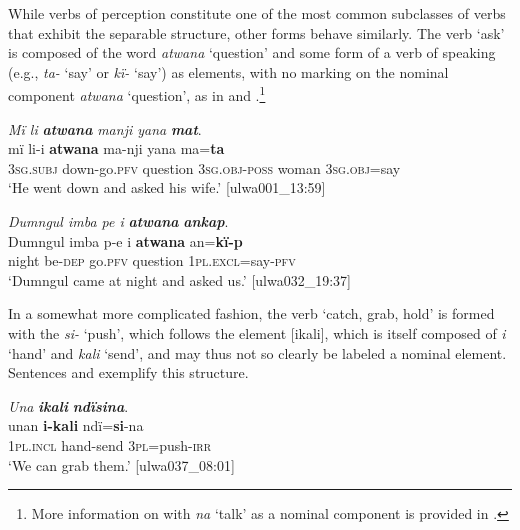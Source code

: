 While  verbs of perception constitute one of the most common subclasses of verbs that exhibit the separable structure, other  forms behave similarly. The verb ‘ask’ is composed of the word \textit{atwana} ‘question’ and some form of a verb of speaking (e.g., \textit{ta-} ‘say’ or \textit{kï-} ‘say’) as  elements, with no  marking on the nominal component \textit{atwana} ‘question’, as in  and .\footnote{More information on  with \textit{na} ‘talk’ as a nominal component is provided in .}

\ea%
    \label{ex:phrase:69}
          \textit{Mï li} \textbf{\textit{atwana}} \textit{manji yana} \textbf{\textit{mat}}.\\
\gll mï      li-i        \textbf{atwana}  ma-nji      yana     ma=\textbf{ta}\\
    3\textsc{sg.subj}  down-go.\textsc{pfv}  question  3\textsc{sg.obj-poss}  woman    3\textsc{sg.obj}=say\\
\glt `He went down and asked his wife.’ [ulwa001\_13:59]
\z

\ea%
    \label{ex:phrase:70}
          \textit{Dumngul imba pe i} \textbf{\textit{atwana}} \textbf{\textit{ankap}}.\\
\gll Dumngul  imba  p-e    i    \textbf{atwana}  an=\textbf{kï-p}\\
    [name]    night  be\textsc{{}-dep} go.\textsc{pfv}  question  1\textsc{pl.excl}=say-\textsc{pfv}\\
\glt `Dumngul came at night and asked us.’ [ulwa032\_19:37]
\z

  In a somewhat more complicated fashion, the verb ‘catch, grab, hold’ is formed with the  \textit{si-} ‘push’, which follows the  element [ikali], which is itself composed of \textit{i} ‘hand’ and \textit{kali} ‘send’, and may thus not so clearly be labeled a nominal element. Sentences  and  exemplify this structure.

\ea%
    \label{ex:phrase:71}
          \textit{Una} \textbf{\textit{ikali}} \textbf{\textit{ndïsina}}.\\
\gll unan    \textbf{i-kali}    ndï=\textbf{si}{}-na\\
    1\textsc{pl.incl}  hand-send  3\textsc{pl}=push-\textsc{irr}\\
\glt `We can grab them.’ [ulwa037\_08:01]
\z

